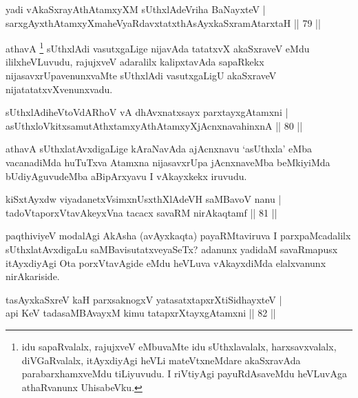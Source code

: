 \begin{shl}
yadi vA\s kaSxrayAthAtamxyXM sUthxlAdeVriha BaNayxteV |\\
sarxgAyxthAtamxyXmaheVyaRdavxtatxthA\s sAyxkaSxramAtarxtaH \hfill || 79 ||
\end{shl}

\begin{artha}
athavA \footnote{idu sapaRvalalx, rajujxveV eMbuvaMte idu sUthxlavalalx, harxsavxvalalx, diVGaRvalalx, itAyxdiyAgi heVLi mateVtxneMdare akaSxravAda parabarxhamxveMdu tiLiyuvudu. I riVtiyAgi payuRdAsaveMdu heVLuvAga athaRvanunx UhisabeVku.} sUthxlAdi vasutxgaLige nijavAda tatatxvX akaSxraveV eMdu ililx\break heVLuvudu, rajujxveV adaralilx kalipxtavAda sapaRkekx nijasavxrUpavenunxvaMte sUthxlAdi vasutxgaLigU akaSxraveV nijatatatxvXvenunxvadu.
\end{artha}

\begin{shl}
sUthxlAdiheVtoVdARhoV vA dhAvxnatxsayx parxtayxgAtamxni |\\
asUthxloVkitxsamutAthxtamxyAthAtamxyXjAcnxnavahinxnA \hfill || 80 ||
\end{shl}

\begin{artha}
athavA sUthxlatAvxdigaLige kAraNavAda ajAcnxnavu `asUthxla' eMba vacanadiMda huTuTxva Atamxna nijasavxrUpa jAcnxnaveMba beMkiyiMda bUdiyAguvudeMba aBipArxyavu I vAkayxkekx iruvudu.
\end{artha}


\begin{shl}
kiSxtAyxdw viyadanetxV\s simxnUsxthXlAdeVH saMBavoV nanu |\\
tadoVtaporxVtavAkeyxVna tacacx savaRM nirAkaqtamf \hfill || 81 ||
\end{shl}

\begin{artha}%
paqthiviyeV modalAgi AkAsha (avAyxkaqta) payaRMtaviruva I parxpaMcadalilx sUthxlatAvxdigaLu saMBavisutatxveyaSeTx? adanunx yadidaM savaRmapusx itAyxdiyAgi Ota porxVtavAgide eMdu heVLuva vAkayxdiMda elalxvanunx nirAkariside.
\end{artha}


\begin{shl}
tasAyxkaSxreV kaH parxsaknogxV yatasatxtapxrXtiSidhayxteV |\\
api KeV tadasaMBAvayxM kimu tatapxrXtayxgAtamxni \hfill || 82 ||
\end{shl}

